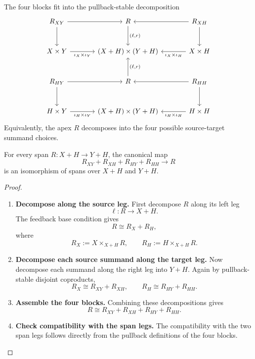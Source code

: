 The four blocks fit into the pullback-stable decomposition
\[
\begin{tikzcd}[column sep=large,row sep=large]
  R_{XY}
    \ar[r]
    \ar[d]
  &
  R
    \ar[d,"{(\ell,r)}"]
  &
  R_{XH}
    \ar[l]
    \ar[d]
  \\
  X\times Y
    \ar[r,"{\iota_X\times\iota_Y}"']
  &
  (X+H)\times(Y+H)
  &
  X\times H
    \ar[l,"{\iota_X\times\iota_H}"]
  \\
  R_{HY}
    \ar[r]
    \ar[d]
  &
  R
    \ar[u,"{(\ell,r)}"']
  &
  R_{HH}
    \ar[l]
    \ar[d]
  \\
  H\times Y
    \ar[r,"{\iota_H\times\iota_Y}"']
  &
  (X+H)\times(Y+H)
  &
  H\times H
    \ar[l,"{\iota_H\times\iota_H}"]
\end{tikzcd}
\]
Equivalently, the apex \(R\) decomposes into the four possible source-target
summand choices.

\begin{proposition}
\label{prop:block-decomposition-feedback}
For every span \(R:X+H\to Y+H\), the canonical map
\[
  R_{XY}+R_{XH}+R_{HY}+R_{HH}\longrightarrow R
\]
is an isomorphism of spans over \(X+H\) and \(Y+H\).
\end{proposition}

\begin{proof}
\begin{enumerate}
  \item \textbf{Decompose along the source leg.}
  First decompose \(R\) along its left leg
  \[
    \ell:R\to X+H.
  \]
  The feedback base condition gives
  \[
    R\cong R_X+R_H,
  \]
  where
  \[
    R_X:=X\times_{X+H}R,
    \qquad
    R_H:=H\times_{X+H}R.
  \]

  \item \textbf{Decompose each source summand along the target leg.}
  Now decompose each summand along the right leg into \(Y+H\). Again by
  pullback-stable disjoint coproducts,
  \[
    R_X\cong R_{XY}+R_{XH},
    \qquad
    R_H\cong R_{HY}+R_{HH}.
  \]

  \item \textbf{Assemble the four blocks.}
  Combining these decompositions gives
  \[
    R\cong R_{XY}+R_{XH}+R_{HY}+R_{HH}.
  \]

  \item \textbf{Check compatibility with the span legs.}
  The compatibility with the two span legs follows directly from the pullback
  definitions of the four blocks.
\end{enumerate}
\end{proof}

